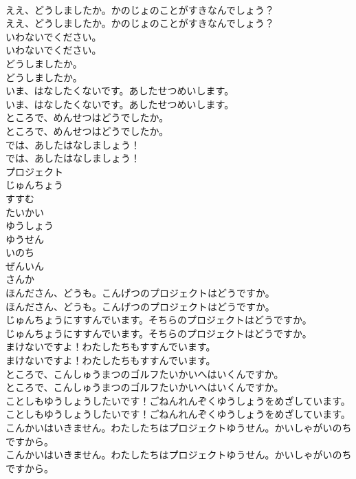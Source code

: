 \documentclass[8pt]{extreport}
\begin{document}
\begin{CJK}{UTF8}{min}
\\	ええ、どうしましたか。かのじょのことがすきなんでしょう？	
\\	ええ、どうしましたか。かのじょのことがすきなんでしょう？ 
\\	いわないでください。	
\\	いわないでください。 
\\	どうしましたか。	
\\	どうしましたか。 
\\	いま、はなしたくないです。あしたせつめいします。	
\\	いま、はなしたくないです。あしたせつめいします。 
\\	ところで、めんせつはどうでしたか。	
\\	ところで、めんせつはどうでしたか。 
\\	では、あしたはなしましょう！	
\\	では、あしたはなしましょう！ 
\\	プロジェクト
\\	じゅんちょう
\\	すすむ
\\	たいかい
\\	ゆうしょう
\\	ゆうせん
\\	いのち
\\	ぜんいん
\\	さんか
\\	ほんださん、どうも。こんげつのプロジェクトはどうですか。	
\\	ほんださん、どうも。こんげつのプロジェクトはどうですか。 
\\	じゅんちょうにすすんでいます。そちらのプロジェクトはどうですか。	
\\	じゅんちょうにすすんでいます。そちらのプロジェクトはどうですか。 
\\	まけないですよ！わたしたちもすすんでいます。	
\\	まけないですよ！わたしたちもすすんでいます。 
\\	ところで、こんしゅうまつのゴルフたいかいへはいくんですか。	
\\	ところで、こんしゅうまつのゴルフたいかいへはいくんですか。 
\\	ことしもゆうしょうしたいです！ごねんれんぞくゆうしょうをめざしています。	
\\	ことしもゆうしょうしたいです！ごねんれんぞくゆうしょうをめざしています。 
\\	こんかいはいきません。わたしたちはプロジェクトゆうせん。かいしゃがいのちですから。	
\\	こんかいはいきません。わたしたちはプロジェクトゆうせん。かいしゃがいのちですから。 

\end{CJK}
\end{document}
